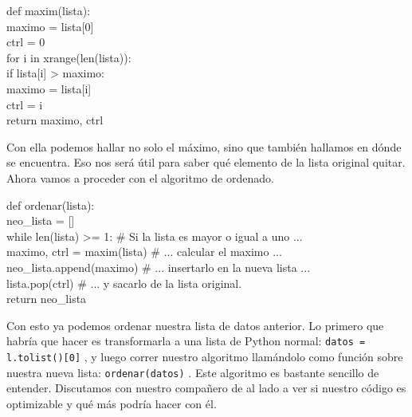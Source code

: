 \documentclass[10pt,letterpaper]{article}
\newcommand{\inlinecode}[1]{
\colorbox{light-gray}{\texttt{#1}}
}
\newenvironment{Code}
{
\begin{lrbox}{\selvestebox}%
\begin{minipage}{\dimexpr\columnwidth-2\fboxsep\relax}
\fontfamily{\ttdefault}\selectfont
}
{\end{minipage}\end{lrbox}%
\begin{center}
\colorbox{light-gray}{\usebox{\selvestebox}}
\end{center}
}
\begin{document}
\begin{footnotesize}
\begin{Code}
def maxim(lista):\\
\hspace*{5mm} maximo = lista[0]\\
\hspace*{5mm} ctrl = 0\\
\hspace*{5mm} for i in xrange(len(lista)):\\
\hspace*{11mm} if lista[i] > maximo:\\
\hspace*{17mm} maximo = lista[i]\\
\hspace*{17mm} ctrl = i\\
\hspace*{5mm} return maximo, ctrl
\end{Code}
\end{footnotesize}

Con ella podemos hallar no solo el m\'aximo, sino que tambi\'en hallamos en d\'onde se encuentra. Eso nos ser\'a \'util para saber qu\'e elemento de la lista original quitar. Ahora vamos a proceder con el algoritmo de ordenado.

\begin{footnotesize}
\begin{Code}
def ordenar(lista):\\
\hspace*{5mm} neo\_lista = []\\
\hspace*{5mm} while len(lista) >= 1: \# Si la lista es mayor o igual a uno ...\\
\hspace*{11mm} maximo, ctrl = maxim(lista) \# ... calcular el maximo ...\\
\hspace*{11mm} neo\_lista.append(maximo) \# ... insertarlo en la nueva lista ...\\
\hspace*{11mm} lista.pop(ctrl) \# ... y sacarlo de la lista original.\\
\hspace*{5mm} return neo\_lista
\end{Code}
\end{footnotesize}

Con esto ya podemos ordenar nuestra lista de datos anterior. Lo primero que habr\'ia que hacer es transformarla a una lista de Python normal: \inlinecode{datos = l.tolist()[0]}, y luego correr nuestro algoritmo llam\'andolo como funci\'on sobre nuestra nueva lista: \inlinecode{ordenar(datos)}. Este algoritmo es bastante sencillo de entender. Discutamos con nuestro compa\~nero de al lado a ver si nuestro c\'odigo es optimizable y qu\'e m\'as podr\'ia hacer con \'el.\\
\end{document}
